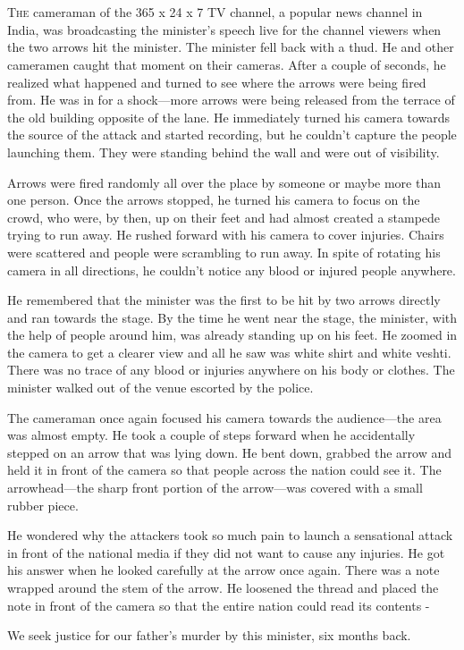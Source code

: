 \chapter{}

\lettrine{T}{he} cameraman of the 365 x 24 x 7 TV channel, a popular news channel in India,
was broadcasting the minister's speech live for the channel viewers when the two
arrows hit the minister. The minister fell back with a thud. He and other
cameramen caught that moment on their cameras. After a couple of seconds, he
realized what happened and turned to see where the arrows were being fired from.
He was in for a shock—more arrows were being released from the terrace of the
old building opposite of the lane. He immediately turned his camera towards the
source of the attack and started recording, but he couldn't capture the people
launching them. They were standing behind the wall and were out of visibility.

Arrows were fired randomly all over the place by someone or maybe more than one
person. Once the arrows stopped, he turned his camera to focus on the crowd, who
were, by then, up on their feet and had almost created a stampede trying to run
away. He rushed forward with his camera to cover injuries. Chairs were scattered
and people were scrambling to run away. In spite of rotating his camera in all
directions, he couldn't notice any blood or injured people anywhere.

He remembered that the minister was the first to be hit by two arrows directly
and ran towards the stage. By the time he went near the stage, the minister,
with the help of people around him, was already standing up on his feet. He
zoomed in the camera to get a clearer view and all he saw was white shirt and
white veshti. There was no trace of any blood or injuries anywhere on his body
or clothes. The minister walked out of the venue escorted by the police.

The cameraman once again focused his camera towards the audience—the area was
almost empty. He took a couple of steps forward when he accidentally stepped on
an arrow that was lying down. He bent down, grabbed the arrow and held it in
front of the camera so that people across the nation could see it. The
arrowhead—the sharp front portion of the arrow—was covered with a small rubber
piece.

He wondered why the attackers took so much pain to launch a sensational attack
in front of the national media if they did not want to cause any injuries. He
got his answer when he looked carefully at the arrow once again. There was a
note wrapped around the stem of the arrow. He loosened the thread and placed the
note in front of the camera so that the entire nation could read its contents -

We seek justice for our father's murder by this minister, six months back.